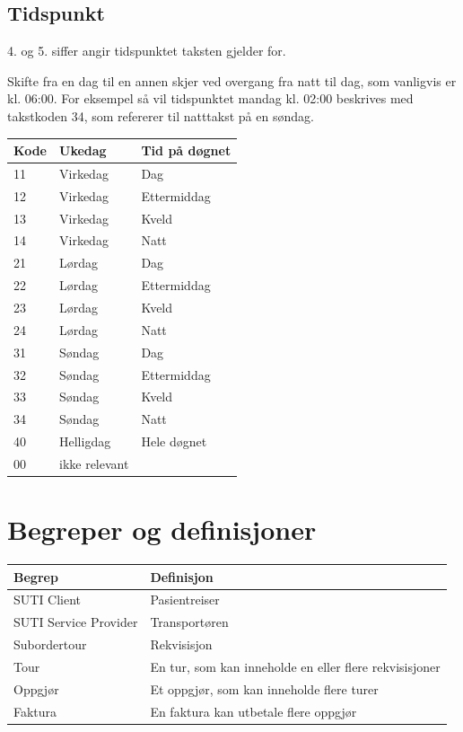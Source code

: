 \documentclass[a4paper,titlepage,norsk,11pt]{article}
\begin{document}
\subsection{Tidspunkt}
4. og 5. siffer angir tidspunktet taksten gjelder for.

Skifte fra en dag til en annen skjer ved overgang fra natt til dag, som vanligvis er kl. 06:00. For eksempel så vil tidspunktet mandag kl. 02:00 beskrives med takstkoden 34, som refererer til natttakst på en søndag.

\begin{tabularx}{\textwidth}{|l|l|X|}
\hline
\textbf{Kode} & \textbf{Ukedag} & \textbf{Tid på døgnet} \\\hline
11 & Virkedag & Dag \\\hline
12 & Virkedag & Ettermiddag \\\hline
13 & Virkedag & Kveld \\\hline
14 & Virkedag & Natt \\\hline
21 & Lørdag & Dag \\\hline
22 & Lørdag & Ettermiddag \\\hline
23 & Lørdag & Kveld \\\hline
24 & Lørdag & Natt \\\hline
31 & Søndag & Dag \\\hline
32 & Søndag & Ettermiddag \\\hline
33 & Søndag & Kveld \\\hline
34 & Søndag & Natt \\\hline
40 & Helligdag & Hele døgnet \\\hline
00 & ikke relevant & \\\hline
\end{tabularx}

\section{Begreper og definisjoner}

\begin{tabularx}{\textwidth}{|l|X|}
\hline
\textbf{Begrep} & \textbf{Definisjon} \\\hline
SUTI Client & Pasientreiser \\\hline
SUTI Service Provider & Transportøren \\\hline
Subordertour & Rekvisisjon \\\hline
Tour & En tur, som kan inneholde en eller flere rekvisisjoner \\\hline
Oppgjør & Et oppgjør, som kan inneholde flere turer \\\hline
Faktura & En faktura kan utbetale flere oppgjør \\\hline
\end{tabularx}
\end{document}
